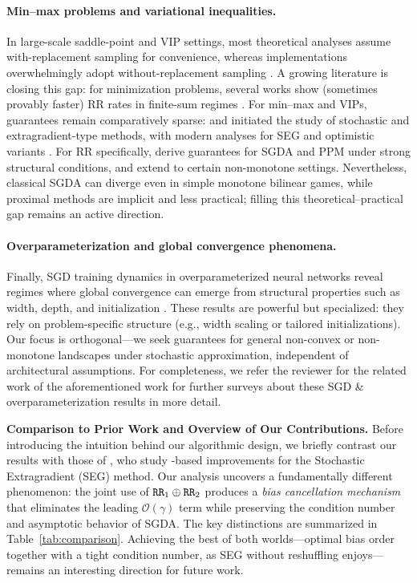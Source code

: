 \paragraph{Min–max problems and variational inequalities.}
In large-scale saddle-point and VIP settings, most theoretical analyses assume with-replacement sampling for convenience, whereas implementations overwhelmingly adopt without-replacement sampling \citep{Bottou2012StochasticGD}. A growing literature is closing this gap: for minimization problems, several works show (sometimes provably faster) RR rates in finite-sum regimes \citep{mishchenko2020random,ahn2020sgd,gurbuzbalaban2021random,cai2023empirical}. For min–max and VIPs, guarantees remain comparatively sparse: \citet{chen1997convergence} and \citet{korpelevich1976extragradient} initiated the study of stochastic and extragradient-type methods, with modern analyses for SEG and optimistic variants \citep{gorbunov2022extragradient,gorbunov2022last,hsieh2019convergence,choudhury2023single}. For RR specifically, \citet{das2022sampling} derive guarantees for SGDA and PPM under strong structural conditions, and \citet{cho2023sgda} extend to certain non-monotone settings. Nevertheless, classical SGDA can diverge even in simple monotone bilinear games, while proximal methods are implicit and less practical; filling this theoretical–practical gap remains an active direction.

\paragraph{Overparameterization and global convergence phenomena.}
Finally, SGD training dynamics in overparameterized neural networks reveal regimes where global convergence can emerge from structural properties such as width, depth, and initialization \citep{du2019gradient,zou2020gradient,nguyen2020global,liu2023aiming}. These results are powerful but specialized: they rely on problem-specific structure (e.g., width scaling or tailored initializations). Our focus is orthogonal—we seek guarantees for general non-convex or non-monotone landscapes under stochastic approximation, independent of architectural assumptions. For completeness, we refer the reviewer for the related work of the aforementioned work for further  surveys about these SGD \& overparameterization results in more detail.

\textbf{Comparison to Prior Work and Overview of Our Contributions.}
Before introducing the intuition behind our algorithmic design, we briefly contrast our results with those of \cite{emmanouilidis2024stochastic}, who study \RRresh-based improvements for the Stochastic Extragradient (SEG) method. 
Our analysis uncovers a fundamentally different phenomenon: the joint use of $\texttt{RR}\textsubscript{1} \oplus \texttt{RR}\textsubscript{2}$ produces a \emph{bias cancellation mechanism} that eliminates the leading $\mathcal{O}(\gamma)$ term while preserving the condition number and asymptotic behavior of SGDA. 
The key distinctions are summarized in Table~\ref{tab:comparison}. 
Achieving the best of both worlds—optimal bias order together with a tight condition number, as SEG without reshuffling enjoys—remains an interesting direction for future work.

